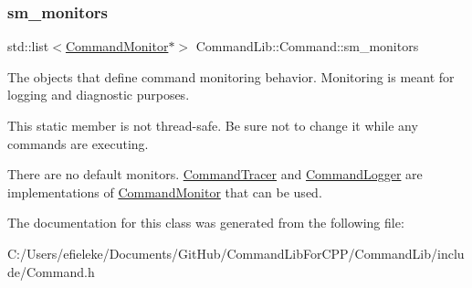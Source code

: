 \subsubsection{\texorpdfstring{sm\+\_\+monitors}{sm\_monitors}}
{\footnotesize\ttfamily std\+::list$<$\mbox{\hyperlink{class_command_lib_1_1_command_monitor}{Command\+Monitor}}$\ast$$>$ Command\+Lib\+::\+Command\+::sm\+\_\+monitors\hspace{0.3cm}{\ttfamily [static]}}



The objects that define command monitoring behavior. Monitoring is meant for logging and diagnostic purposes. 

This static member is not thread-\/safe. Be sure not to change it while any commands are executing. 

There are no default monitors. \mbox{\hyperlink{class_command_lib_1_1_command_tracer}{Command\+Tracer}} and \mbox{\hyperlink{class_command_lib_1_1_command_logger}{Command\+Logger}} are implementations of \mbox{\hyperlink{class_command_lib_1_1_command_monitor}{Command\+Monitor}} that can be used. 

The documentation for this class was generated from the following file\+:\begin{DoxyCompactItemize}
\item 
C\+:/\+Users/efieleke/\+Documents/\+Git\+Hub/\+Command\+Lib\+For\+C\+P\+P/\+Command\+Lib/include/Command.\+h\end{DoxyCompactItemize}
